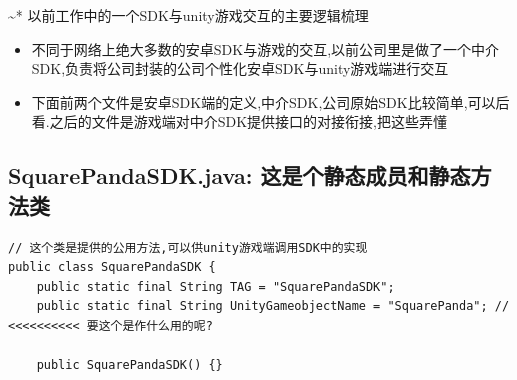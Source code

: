 \documentclass[9pt, b5paper]{article}
\begin{document}
\textasciitilde{}* 以前工作中的一个SDK与unity游戏交互的主要逻辑梳理
\begin{itemize}
\item 不同于网络上绝大多数的安卓SDK与游戏的交互,以前公司里是做了一个中介SDK,负责将公司封装的公司个性化安卓SDK与unity游戏端进行交互
\item 下面前两个文件是安卓SDK端的定义,中介SDK,公司原始SDK比较简单,可以后看.之后的文件是游戏端对中介SDK提供接口的对接衔接,把这些弄懂
\end{itemize}
\subsection{SquarePandaSDK.java: 这是个静态成员和静态方法类}
\label{sec-5-3}
\begin{verbatim}
// 这个类是提供的公用方法,可以供unity游戏端调用SDK中的实现
public class SquarePandaSDK {
    public static final String TAG = "SquarePandaSDK"; 
    public static final String UnityGameobjectName = "SquarePanda"; // <<<<<<<<<< 要这个是作什么用的呢?

    public SquarePandaSDK() {}


\end{verbatim}
\end{document}
